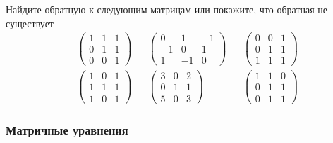 \begin{exercise}
Найдите обратную к следующим матрицам или покажите, что обратная не существует
\begin{align*}
	&\begin{pmatrix}
		1 & 1 & 1 \\ 0 & 1 & 1 \\ 0 & 0 & 1
	\end{pmatrix} &
	&\begin{pmatrix}
		0 & 1 & -1 \\ -1 & 0 & 1 \\ 1 & -1 & 0
	\end{pmatrix} &
	&\begin{pmatrix}
		0 & 0 & 1 \\ 0 & 1 & 1 \\ 1 & 1 & 1
	\end{pmatrix} \\
	&\begin{pmatrix}
		1 & 0 & 1 \\ 1 & 1 & 1 \\ 1 & 0 & 1
	\end{pmatrix} &
	&\begin{pmatrix}
		3 & 0 & 2 \\ 0 & 1 & 1 \\ 5 & 0 & 3
	\end{pmatrix} &
	&\begin{pmatrix}
		1 & 1 & 0 \\ 0 & 1 & 1 \\ 0 & 1 & 1
	\end{pmatrix}
\end{align*}
\end{exercise}

\subsubsection{Матричные уравнения}

